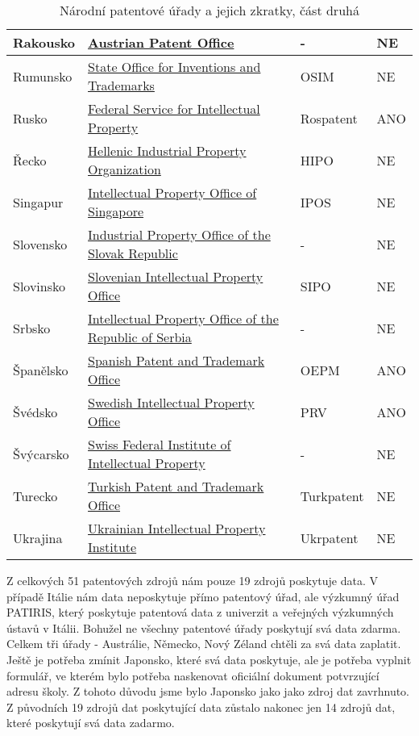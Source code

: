 \begin{table}[H]
\begin{tabular}{|>{\centering\arraybackslash}p{2.2cm}|>{\centering\arraybackslash}p{7cm}|>{\centering\arraybackslash}p{2cm}|>{\centering\arraybackslash}p{1cm}|}
	\hline
	Rakousko & \href{http://www.patentamt.at/}{Austrian Patent Office}  & -     & NE    \\ 
	\hline
	Rumunsko & \href{http://www.osim.ro/}{State Office for Inventions and Trademarks}  & OSIM      & NE   \\ 
	\hline
	Rusko & \href{https://rospatent.gov.ru/}{Federal Service for Intellectual Property}  & Rospatent   & ANO      \\ 
	\hline
	Řecko & \href{http://www.obi.gr/el/}{Hellenic Industrial Property Organization}  & HIPO   & NE      \\ 
	\hline
	Singapur & \href{http://www.ipos.gov.sg/}{Intellectual Property Office of Singapore}  & IPOS    & NE     \\ 
	\hline
	Slovensko & \href{https://www.indprop.gov.sk/}{Industrial Property Office of the Slovak Republic}  & -     & NE    \\ 
	\hline
	Slovinsko & \href{http://www.uil-sipo.si/}{Slovenian Intellectual Property Office}  & SIPO   & NE      \\ 
	\hline
	Srbsko & \href{http://www.zis.gov.rs/}{Intellectual Property Office of the Republic of Serbia}  & -   & NE      \\ 
	\hline
	Španělsko & \href{http://www.oepm.es/}{Spanish Patent and Trademark Office}  & OEPM   & ANO      \\ 
	\hline
	Švédsko & \href{http://www.prv.se/}{Swedish Intellectual Property Office}  & PRV   & ANO      \\ 
	\hline
	Švýcarsko & \href{https://www.ige.ch/}{Swiss Federal Institute of Intellectual Property}  & -     & NE    \\ 
	\hline
	Turecko & \href{http://www.turkpatent.gov.tr/}{Turkish Patent and Trademark Office}  & Turkpatent   & NE      \\ 
	\hline
	Ukrajina & \href{https://ukrpatent.org/en}{Ukrainian Intellectual Property Institute}  & Ukrpatent    & NE     \\ 
	\hline
	\end{tabular}
	\caption{Národní patentové úřady a jejich zkratky, část druhá}
	\label{tab:table_offices2}
	\end{table}
\newpage

\noindent Z celkových 51 patentových zdrojů nám pouze 19 zdrojů poskytuje data. V případě Itálie nám data neposkytuje přímo patentový úřad, ale výzkumný úřad PATIRIS, který poskytuje patentová data z univerzit a veřejných výzkumných ústavů v Itálii. 
\newline
\indent Bohužel ne všechny patentové úřady poskytují svá data zdarma. Celkem tři úřady - Austrálie, Německo, Nový Zéland chtěli za svá data zaplatit. 
\newline
\indent Ještě je potřeba zmínit Japonsko, které svá data poskytuje, ale je potřeba vyplnit formulář, ve kterém bylo potřeba naskenovat oficiální dokument potvrzující adresu školy. Z tohoto důvodu jsme bylo Japonsko jako jako zdroj dat zavrhnuto. Z původních 19 zdrojů dat poskytující data zůstalo nakonec jen 14 zdrojů dat, které poskytují svá data zadarmo.

